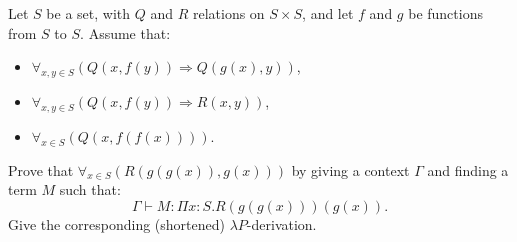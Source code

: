 \begin{problem}{5.11}
    Let $S$ be a set, with $Q$ and $R$ relations on $S \times S$, and let $f$ and $g$ be functions from $S$ to $S$. Assume that:
    \begin{itemize}
    \item $\forall_{x,y \in S}(Q(x, f(y)) \Rightarrow Q(g(x), y))$,
    \item $\forall_{x,y \in S}(Q(x, f(y)) \Rightarrow R(x, y))$,
    \item $\forall_{x \in S}(Q(x, f(f(x))))$.
    \end{itemize}
    Prove that $\forall_{x \in S}(R(g(g(x)), g(x)))$ by giving a context $\Gamma$ and finding a term $M$ such that:
    $$\Gamma \vdash M : \Pi x : S . R(g(g(x)))(g(x)).$$
    Give the corresponding (shortened) $\lambda P$-derivation.
\end{problem}